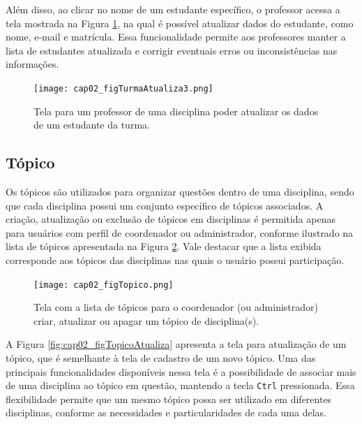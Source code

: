 Além disso, ao clicar no nome de um estudante específico, o professor acessa a tela mostrada na Figura \ref{fig:cap02_figTurmaAtualiza3}, na qual é possível atualizar dados do estudante, como nome, e-mail e matrícula. Essa funcionalidade permite aos professores manter a lista de estudantes atualizada e corrigir eventuais erros ou inconsistências nas informações.

\begin{figure}[!ht]
  \centering
  \texttt{[image: cap02\_figTurmaAtualiza3.png]}
  \caption{Tela para um professor de uma disciplina poder atualizar os dados de um estudante da turma.}
  \label{fig:cap02_figTurmaAtualiza3}
\end{figure}






\subsection{Tópico}\label{sec:topicos}

Os tópicos são utilizados para organizar questões dentro de uma disciplina, sendo que cada disciplina possui um conjunto específico de tópicos associados. A criação, atualização ou exclusão de tópicos em disciplinas é permitida apenas para usuários com perfil de coordenador ou administrador, conforme ilustrado na lista de tópicos apresentada na Figura \ref{fig:cap02_figTopico}. Vale destacar que a lista exibida corresponde aos tópicos das disciplinas nas quais o usuário possui participação.

\begin{figure}[!ht]
  \centering
  \texttt{[image: cap02\_figTopico.png]}
  \caption{Tela com a lista de tópicos para o coordenador (ou administrador) criar, atualizar ou apagar um tópico de disciplina(s).}
  \label{fig:cap02_figTopico}
\end{figure}

A Figura \ref{fig:cap02_figTopicoAtualiza} apresenta a tela para atualização de um tópico, que é semelhante à tela de cadastro de um novo tópico. Uma das principais funcionalidades disponíveis nessa tela é a possibilidade de associar mais de uma disciplina ao tópico em questão, mantendo a tecla \texttt{Ctrl} pressionada. Essa flexibilidade permite que um mesmo tópico possa ser utilizado em diferentes disciplinas, conforme as necessidades e particularidades de cada uma delas.

